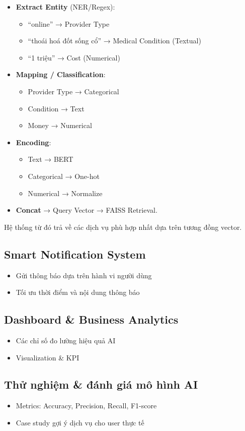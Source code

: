 \begin{itemize}
    \item \textbf{Extract Entity} (NER/Regex):
    \begin{itemize}
        \item ``online'' → Provider Type
        \item ``thoái hoá đốt sống cổ'' → Medical Condition (Textual)
        \item ``1 triệu'' → Cost (Numerical)
    \end{itemize}

    \item \textbf{Mapping / Classification}:
    \begin{itemize}
        \item Provider Type → Categorical
        \item Condition → Text
        \item Money → Numerical
    \end{itemize}

    \item \textbf{Encoding}:
    \begin{itemize}
        \item Text → BERT
        \item Categorical → One-hot
        \item Numerical → Normalize
    \end{itemize}

    \item \textbf{Concat} → Query Vector → FAISS Retrieval.
\end{itemize}

Hệ thống từ đó trả về các dịch vụ phù hợp nhất dựa trên tương đồng vector.



\subsection{Smart Notification System}
\begin{itemize}
    \item Gửi thông báo dựa trên hành vi người dùng
    \item Tối ưu thời điểm và nội dung thông báo
\end{itemize}
\subsection{Dashboard \& Business Analytics}
\begin{itemize}
    \item Các chỉ số đo lường hiệu quả AI
    \item Visualization \& KPI
\end{itemize}
\subsection{Thử nghiệm \& đánh giá mô hình AI}
\begin{itemize}
    \item Metrics: Accuracy, Precision, Recall, F1-score
    \item Case study gợi ý dịch vụ cho user thực tế
\end{itemize}